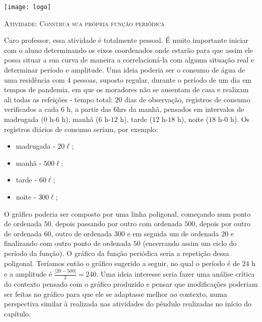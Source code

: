 \documentclass[10 pt,usenames,dvipsnames, oneside]{article}
\begin{document}
\begin{center}
  \begin{minipage}[l]{3cm}
\texttt{[image: logo]}    
\end{minipage}\hfill
\begin{minipage}[r]{.8\textwidth}
 {\Large \scshape Atividade: Construa sua própria função periódica}  
\end{minipage}
\end{center}
\vspace{.2cm}

\ifdefined\prof

\begin{sugestions}

Caro professor, essa atividade é totalmente pessoal. É muito importante iniciar com o aluno determinando os eixos coordenados onde estarão para que assim ele possa situar a sua curva de maneira a correlacioná-la com alguma situação real e determinar período e amplitude. Uma ideia poderia ser o consumo de água de uma residência com 4 pessoas, suposto regular, durante o período de um dia em tempos de pandemia, em que os moradores não se ausentam de casa e realizam ali todas as refeições - tempo total: $20$ dias de observação, registros de consumo verificados a cada $6$ h, a partir das 6hrs da manhã, pensados em intervalos de madrugada ($0$ h-$6$ h), manhã ($6$ h-$12$ h), tarde ($12$ h-$18$ h), noite ($18$ h-$0$ h). Os registros diários de consumo seriam, por exemplo:
	\begin{itemize}[topsep=2pt]
	 \item madrugada - $20\ell$; 
	 \item manhã - $500\ell$; 
	 \item tarde - $60\ell$; 
	 \item noite - $300\ell$;
	 \end{itemize}
	 O gráfico poderia ser composto por uma linha poligonal, começando num ponto de ordenada $50$, depois passando por outro com ordenada $500$, depois por outro de ordenada $60$, outro de ordenada $300$ e em seguida um de ordenada $20$ e finalizando com outro ponto de ordenada $50$ (encerrando assim um ciclo do período da função). O gráfico da função periódica seria a repetição dessa poligonal. Teríamos então o gráfico sugerido a seguir, no qual o período é de $24$ h e a amplitude é $\frac{|20 - 500|}{2}=240$. Uma ideia interesse seria fazer uma análise crítica do contexto pensado com o gráfico produzido e pensar que modificações poderiam ser feitas no gráfico para que ele se adaptasse melhor ao contexto, numa perspectiva similar à realizada nas atividades do pêndulo realizadas no início do capítulo.
\end{sugestions}
\end{document}
